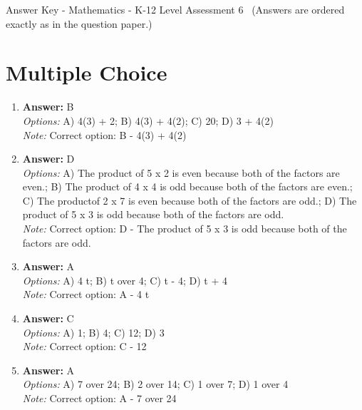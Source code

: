 \documentclass[12pt]{article}
\begin{document}
\begin{center}
Answer Key - Mathematics - K-12 Level Assessment 6 \
\small (Answers are ordered exactly as in the question paper.)
\end{center}

\section*{Multiple Choice}
\begin{enumerate}[label=\arabic*.]
\item \textbf{Answer:} B
\\ \textit{Options:} A) 4(3) + 2; B) 4(3) + 4(2); C) 20; D) 3 + 4(2)
\\ \textit{Note:} Correct option: B - 4(3) + 4(2)
\item \textbf{Answer:} D
\\ \textit{Options:} A) The product of 5 x 2 is even because both of the factors are even.; B) The product of 4 x 4 is odd because both of the factors are even.; C) The productof 2 x 7 is even because both of the factors are odd.; D) The product of 5 x 3 is odd because both of the factors are odd.
\\ \textit{Note:} Correct option: D - The product of 5 x 3 is odd because both of the factors are odd.
\item \textbf{Answer:} A
\\ \textit{Options:} A) 4 t; B) t over 4; C) t - 4; D) t + 4
\\ \textit{Note:} Correct option: A - 4 t
\item \textbf{Answer:} C
\\ \textit{Options:} A) 1; B) 4; C) 12; D) 3
\\ \textit{Note:} Correct option: C - 12
\item \textbf{Answer:} A
\\ \textit{Options:} A) 7 over 24; B) 2 over 14; C) 1 over 7; D) 1 over 4
\\ \textit{Note:} Correct option: A - 7 over 24
\end{enumerate}
\end{document}
